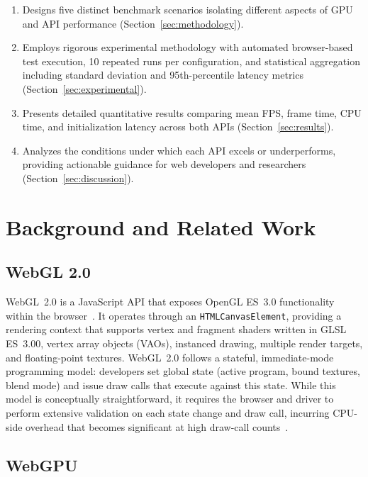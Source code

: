 \documentclass[conference]{IEEEtran}
\begin{document}
\begin{enumerate}
    \item Designs five distinct benchmark scenarios isolating different aspects of GPU and API performance (Section~\ref{sec:methodology}).
    \item Employs rigorous experimental methodology with automated browser-based test execution, 10 repeated runs per configuration, and statistical aggregation including standard deviation and 95th-percentile latency metrics (Section~\ref{sec:experimental}).
    \item Presents detailed quantitative results comparing mean FPS, frame time, CPU time, and initialization latency across both APIs (Section~\ref{sec:results}).
    \item Analyzes the conditions under which each API excels or underperforms, providing actionable guidance for web developers and researchers (Section~\ref{sec:discussion}).
\end{enumerate}

\section{Background and Related Work}
\label{sec:background}

\subsection{WebGL 2.0}

WebGL~2.0 is a JavaScript API that exposes OpenGL ES~3.0 functionality within the browser~\cite{khronos2017webgl2}. It operates through an \texttt{HTMLCanvasElement}, providing a rendering context that supports vertex and fragment shaders written in GLSL ES~3.00, vertex array objects (VAOs), instanced drawing, multiple render targets, and floating-point textures. WebGL~2.0 follows a stateful, immediate-mode programming model: developers set global state (active program, bound textures, blend mode) and issue draw calls that execute against this state. While this model is conceptually straightforward, it requires the browser and driver to perform extensive validation on each state change and draw call, incurring CPU-side overhead that becomes significant at high draw-call counts~\cite{sellers2016vulkan}.

\subsection{WebGPU}
\end{document}

